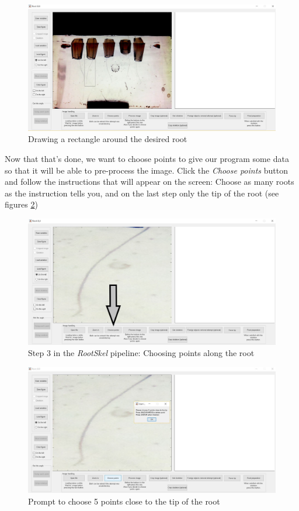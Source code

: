 \begin{figure}[H]
  	\centering
  	\includegraphics[width=\textwidth]{../Figures/manual/step5.jpg}
  	\caption{Drawing a rectangle around the desired root}
  	\label{fig:img8}
\end{figure}
  
Now that that's done, we want to choose points to give our program some data so that it will be able to pre-process the image.
Click the \textit{Choose points} button and follow the instructions that will appear on the screen: Choose as many roots as the instruction tells you, and on the last step only the tip of the root (see figures \ref{fig:img9})

\begin{figure}[H]
	\centering
	\includegraphics[width=\textwidth]{../Figures/manual/step6.jpg}
	\caption{Step 3 in the \textit{RootSkel} pipeline: Choosing points along the root}
	\label{fig:img9}
\end{figure}

\begin{figure}[H]
	\centering
	\includegraphics[width=\textwidth]{../Figures/manual/step7.jpg}
	\caption{Prompt to choose 5 points close to the tip of the root}
	\label{fig:img10}
\end{figure}

